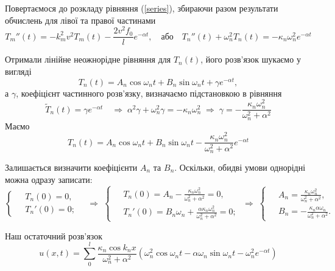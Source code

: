 Повертаємося до розкладу рівняння (\ref{series}), збираючи разом результати обчислень для лівої та правої частинами
\begin{equation}
    T_m''(t) = - k_m^2v^2 T_m(t)  - \frac{2v^2 f_0}{l} e^{-\alpha t}, \quad \text{або} \quad T_n''(t) + \omega_n^2 T_n(t) = - \kappa_n \omega_n^2  e^{-\alpha t}
\end{equation}

Отримали лінійне неожнорідне рівняння для $T_n(t)$, його розв'язок шукаємо у вигляді
\begin{equation}
    T_n(t) = A_n \cos\omega_nt + B_n \sin\omega_nt + \gamma e^{-\alpha t},
\end{equation}
а $\gamma$, коефіцієнт частинного розв'язку, визначаємо підстановкою в рівняння
\begin{equation*}
    \widetilde{T}_n(t) = \gamma e^{-\alpha t} 
    \quad\Rightarrow\;
    \alpha^2\gamma + \omega_n^2\gamma = - \kappa_n \omega_n^2
    \;\Rightarrow\;
    \gamma = - \frac{\kappa_n \omega_n^2}{\omega_n^2 + \alpha^2}
\end{equation*} 
Маємо
\begin{equation}
    T_n(t) = A_n \cos\omega_nt + B_n \sin\omega_nt - \frac{\kappa_n \omega_n^2}{\omega_n^2 + \alpha^2} e^{-\alpha t}
\end{equation}

Залишається визначити коефіцієнти $A_n$ та $B_n$. Оскільки, обидві умови однорідні можна одразу записати:
\begin{equation*}
    \left\{ \begin{aligned}
        \;&T_n(0) = 0,\\
        &T_n'(0) = 0; 
    \end{aligned} \right.
    \quad\Rightarrow\;
    \left\{ \begin{aligned}
        \;&T_n(0) = A_n - \frac{\kappa_n \omega_n^2}{\omega_n^2 + \alpha^2} = 0,\\
        &T_n'(0) = B_n\omega_n + \frac{\alpha \kappa_n \omega_n^2}{\omega_n^2 + \alpha^2} = 0; 
    \end{aligned} \right.
    \;\Rightarrow\;
    \left\{ \begin{aligned}
        \;&A_n = \frac{\kappa_n \omega_n^2}{\omega_n^2 + \alpha^2},\\
        &B_n = - \frac{\kappa_n \alpha \omega_n}{\omega_n^2 + \alpha^2}. 
    \end{aligned} \right.
\end{equation*}

Наш остаточний розв'язок 
\begin{equation}
    u(x,t) = \sum\limits_0^l \frac{\kappa_n \cos k_nx}{\omega_n^2 + \alpha^2} \left(\omega_n^2 \cos\omega_nt - \alpha \omega_n \sin\omega_nt - \omega_n^2 e^{-\alpha t} \right)
\end{equation}

%